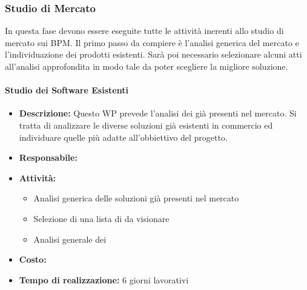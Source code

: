 \subsubsection{Studio di Mercato}
In questa fase devono essere eseguite tutte le attività inerenti allo studio di mercato sui  BPM.
Il primo passo da compiere è l'analisi generica del mercato e l'individuazione dei prodotti esistenti. Sarà poi necessario selezionare alcuni  atti all'analisi approfondita in modo tale da poter scegliere la migliore soluzione. 

\paragraph{Studio dei Software Esistenti }
\begin{itemize}
\item{\bfseries Descrizione:} Questo WP prevede l'analisi dei  già presenti nel mercato. Si tratta di analizzare le diverse soluzioni già esistenti in commercio ed individuare quelle più adatte all'obbiettivo del progetto. 

\item {\bfseries Responsabile:}
\item  {\bfseries Attività:}
		\begin{itemize}
		\item Analisi generica delle soluzioni  già presenti nel mercato
		\item Selezione di una lista di  da visionare
		\item Analisi generale dei 
		\end{itemize}

\item  {\bfseries Costo:}
\item  {\bfseries Tempo di realizzazione:} 6 giorni lavorativi
\end{itemize}

